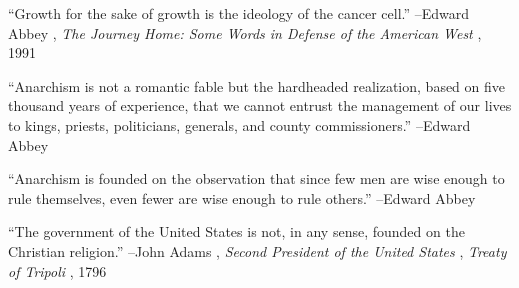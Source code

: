 \documentclass{article}%
\begin{document}
\linebreak%
\vspace{1mm}%
\begin{minipage}{\textwidth}%
\flushleft%
“Growth for the sake of growth is the ideology of the cancer cell.”%
\linebreak%
\vspace{1mm}%
–Edward Abbey%
, \textit{The Journey Home: Some Words in Defense of the American West}%
, 1991%
\linebreak%
\vspace{1mm}%
\end{minipage}%
\linebreak%
\vspace{1mm}%
\begin{minipage}{\textwidth}%
\flushleft%
“Anarchism is not a romantic fable but the hardheaded realization, based on five thousand years of experience, that we cannot entrust the management of our lives to kings, priests, politicians, generals, and county commissioners.”%
\linebreak%
\vspace{1mm}%
–Edward Abbey%
\linebreak%
\vspace{1mm}%
\end{minipage}%
\linebreak%
\vspace{1mm}%
\begin{minipage}{\textwidth}%
\flushleft%
“Anarchism is founded on the observation that since few men are wise enough to rule themselves, even fewer are wise enough to rule others.”%
\linebreak%
\vspace{1mm}%
–Edward Abbey%
\linebreak%
\vspace{1mm}%
\end{minipage}%
\linebreak%
\vspace{1mm}%
\begin{minipage}{\textwidth}%
\flushleft%
“The government of the United States is not, in any sense, founded on the Christian religion.”%
\linebreak%
\vspace{1mm}%
–John Adams%
, \textit{Second President of the United States}%
, \textit{Treaty of Tripoli}%
, 1796%
\linebreak%
\vspace{1mm}%
\end{minipage}%
\linebreak%
\end{document}
